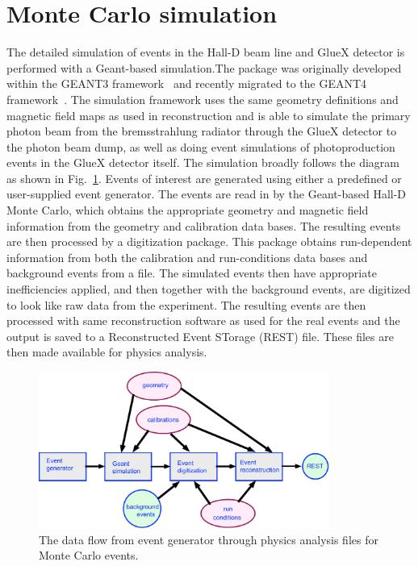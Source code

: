\section[Monte Carlo]{Monte Carlo simulation \label{sec:simulation}}
The detailed simulation of events in the Hall-D beam line and GlueX detector is performed with a Geant-based simulation.The package was originally developed within the GEANT3 framework~\cite{Brun:1987ma} and recently migrated to the GEANT4 framework~\cite{Agostinelli:2002hh,Allison:2016lfl}. The simulation framework uses the same geometry definitions and magnetic field maps as used in reconstruction and is able to simulate the primary photon beam from the bremsstrahlung radiator through the GlueX detector to the photon beam dump, as well as doing event simulations of photoproduction events in the GlueX detector itself. The simulation broadly follows the diagram as shown in Fig.~\ref{fig:MC-data-flow}. Events of interest are generated using either a predefined or user-supplied event generator. The events are read in by the Geant-based Hall-D Monte Carlo, which obtains the appropriate geometry and magnetic field information from the geometry and calibration data bases. The resulting events are then processed by a digitization package. This package obtains run-dependent information from both the calibration and run-conditions data bases and background events from a file. The simulated events then have appropriate inefficiencies applied, and then together with the background events, are digitized to look like raw data from the experiment. The resulting events are then processed with same reconstruction software as used for the real events and the output is saved to a Reconstructed Event STorage (REST) file. These files are then made available for physics analysis.
\begin{figure}[h!]\centering
\includegraphics[width=0.85\textwidth]{figures/MC-data-flow.pdf}
\caption[]{\label{fig:MC-data-flow}The data flow from event generator through physics analysis files for Monte Carlo events.}
\end{figure}

